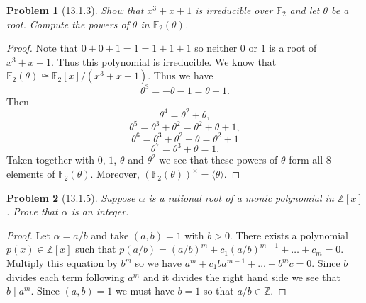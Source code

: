 \documentclass{article}
\newtheorem{problem}{Problem}
\begin{document}

\begin{problem}[13.1.3]
Show that $x^3 + x + 1$ is irreducible over $\mathbb{F}_2$ and let $\theta$ be a root. Compute the powers of $\theta$ in $\mathbb{F}_2(\theta)$.
\end{problem}
\begin{proof}
Note that $0 + 0 + 1 = 1 = 1 + 1 + 1$ so neither $0$ or $1$ is a root of $x^3 + x + 1$. Thus this polynomial is irreducible. We know that $\mathbb{F}_2(\theta) \cong \mathbb{F}_2[x]/(x^3 + x + 1)$. Thus we have
\[
\theta^3 = - \theta - 1 = \theta + 1.
\]
Then
\[
\theta^4 = \theta^2 + \theta,
\]
\[
\theta^5 = \theta^3 + \theta^2 = \theta^2 + \theta + 1,
\]
\[
\theta^6 = \theta^3 + \theta^2 + \theta = \theta^2 + 1
\]
\[
\theta^7 = \theta^3 + \theta = 1.
\]
Taken together with $0$, $1$, $\theta$ and $\theta^2$ we see that these powers of $\theta$ form all $8$ elements of $\mathbb{F}_2(\theta)$. Moreover, $(\mathbb{F}_2(\theta))^{\times} = \langle \theta \rangle$.
\end{proof}

\begin{problem}[13.1.5]
Suppose $\alpha$ is a rational root of a monic polynomial in $\mathbb{Z}[x]$. Prove that $\alpha$ is an integer.
\end{problem}
\begin{proof}
Let $\alpha = a/b$ and take $(a,b) = 1$ with $b > 0$. There exists a polynomial $p(x) \in \mathbb{Z}[x]$ such that $p(a/b) = (a/b)^m + c_1(a/b)^{m-1} + \dots + c_m = 0$. Multiply this equation by $b^m$ so we have $a^m + c_1ba^{m-1} + \dots + b^mc = 0$. Since $b$ divides each term following $a^m$ and it divides the right hand side we see that $b \mid a^m$. Since $(a,b) = 1$ we must have $b = 1$ so that $a/b \in \mathbb{Z}$.
\end{proof}
\end{document}
